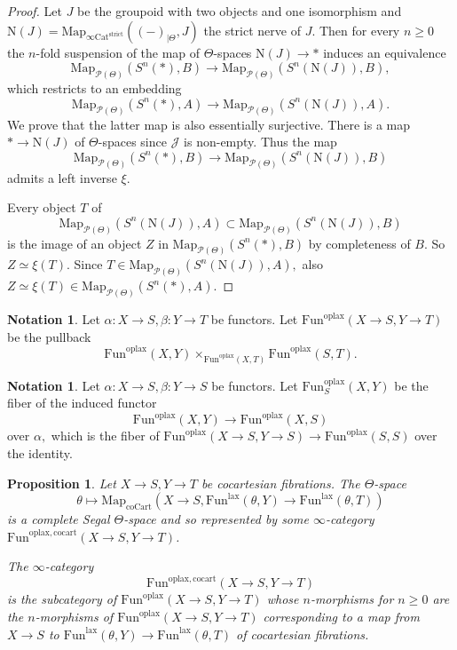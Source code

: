 \documentclass[10pt,oneside]{article}
\numberwithin{equation}{section} %
\numberwithin{figure}{section} %
\theoremstyle{plain}
\newtheorem{proposition}[theorem]{Proposition}
\theoremstyle{definition}
\newtheorem{notation}[theorem]{Notation}
\newcommand{\mJ}{{\mathcal J}}
\newcommand{\mP}{{\mathcal P}}
\newcommand{\J}{{J}}
\newcommand{\N}{{\mathrm N}}
\newcommand{\strict}{\mathrm{strict}}
\newcommand{\Cat}{\mathrm{Cat}}
\newcommand{\Fun}{\mathrm{Fun}}
\newcommand{\cocart}{{\mathrm{cocart}}}
\newcommand{\coCart}{{\mathrm{coCart}}}
\newcommand{\lax}{{\mathrm{lax}}}
\newcommand{\oplax}{{\mathrm{oplax}}}
\newcommand{\Map}{{\mathrm{Map}}}
\begin{document}
\begin{proof}

Let $J$ be the groupoid with two objects and one isomorphism and $\N(J) = \Map_{\infty\Cat^\strict}((-)_{|\Theta},J)$ the strict nerve of $J$.
Then for every $n \geq 0$ the $n$-fold suspension of the map of $\Theta$-spaces
$\N(J) \to *$ induces an equivalence $$ \Map_{\mP(\Theta)}(S^n(*), B) \to \Map_{\mP(\Theta)}(S^n(\N(J)), B),$$
which restricts to an embedding 
$$ \Map_{\mP(\Theta)}(S^n(*), A) \to \Map_{\mP(\Theta)}(S^n(\N(J)), A).$$
We prove that the latter map is also essentially surjective. There is a map $* \to \N(\J)$ of $\Theta$-spaces since $\mJ$ is non-empty. Thus the map $$ \Map_{\mP(\Theta)}(S^n(*), B) \to \Map_{\mP(\Theta)}(S^n(\N(J)), B)$$ admits a left inverse $\xi.$

Every object $T$ of $$\Map_{\mP(\Theta)}(S^n(\N(J)), A) \subset \Map_{\mP(\Theta)}(S^n(\N(J)), B)$$ is the image of an object $Z$ in $\Map_{\mP(\Theta)}(S^n(*), B)$ by completeness of $B.$ So $Z \simeq \xi(T)$. Since $T \in \Map_{\mP(\Theta)}(S^n(\N(J)), A),$
also $Z \simeq \xi(T) \in \Map_{\mP(\Theta)}(S^n(*), A).$
\end{proof}


\begin{notation}

Let $\alpha: X \to S, \beta: Y \to T$ be functors.
Let $\Fun^\oplax(X\to S,Y \to T)$ be the pullback 
$$ \Fun^\oplax(X,Y) \times_{\Fun^\oplax(X,T)} \Fun^\oplax(S,T).$$

\end{notation}

\begin{notation}
Let $\alpha: X \to S, \beta: Y \to S$ be functors.
Let $\Fun^\oplax_S(X,Y)$ be the fiber of the induced functor
$$ \Fun^\oplax(X,Y) \to \Fun^\oplax(X,S)$$ over $\alpha,$
which is the fiber of $\Fun^\oplax(X\to S,Y \to S) \to \Fun^\oplax(S,S)$
over the identity.
    
\end{notation}


\begin{proposition}\label{repren}
Let $X \to S, Y \to T$ be cocartesian fibrations.
The $\Theta$-space 
$$\theta \mapsto \Map_{\coCart}(X \to S , \Fun^\lax(\theta, Y) \to \Fun^\lax(\theta, T)) $$ is a complete Segal $\Theta$-space and so represented by some $\infty$-category
$\Fun^{\oplax, \cocart}(X \to S,Y \to T)$.

The $\infty$-category $$\Fun^{\oplax, \cocart}(X \to S,Y \to T)$$ is the subcategory of $ \Fun^{\oplax}(X \to S,Y \to T)$ whose $n$-morphisms for $n \geq 0$ are the $n$-morphisms of $\Fun^{\oplax}(X \to S,Y \to T)$ corresponding to a map from $X \to S$ to $\Fun^\lax(\theta, Y) \to \Fun^\lax(\theta, T) $ of cocartesian fibrations.

\end{proposition}
\end{document}

